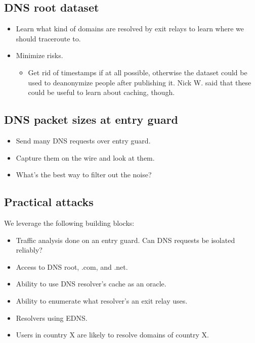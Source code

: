 \subsection{DNS root dataset}
\label{sec:dns-root-dataset}
\begin{itemize}
	\item Learn what kind of domains are resolved by exit relays to learn where
		we should traceroute to.
	\item Minimize risks.
	\begin{itemize}
		\item Get rid of timestamps if at all possible, otherwise the dataset
			could be used to deanonymize people after publishing it.  Nick W.
			said that these could be useful to learn about caching, though.
	\end{itemize}
\end{itemize}

\subsection{DNS packet sizes at entry guard}
\begin{itemize}
	\item Send many DNS requests over entry guard.
	\item Capture them on the wire and look at them.
	\item What's the best way to filter out the noise?
\end{itemize}

\subsection{Practical attacks}
We leverage the following building blocks:
\begin{itemize}
	\item Traffic analysis done on an entry guard.  Can DNS requests be isolated
		reliably?
	\item Access to DNS root, .com, and .net.
	\item Ability to use DNS resolver's cache as an oracle.
	\item Ability to enumerate what resolver's an exit relay uses.
	\item Resolvers using EDNS.
	\item Users in country X are likely to resolve domains of country X.
\end{itemize}
